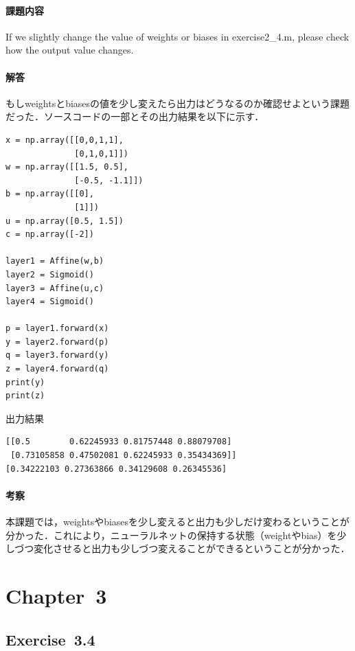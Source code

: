 \documentclass[11pt, a4paper]{jsarticle}
\begin{document}
  \paragraph{ 課題内容}
  If we slightly change the value of weights or biases in exercise2\_4.m, please check how the output value changes.

  \paragraph{ 解答}
  もしweightsとbiasesの値を少し変えたら出力はどうなるのか確認せよという課題だった．ソースコードの一部とその出力結果を以下に示す．

  \begin{lstlisting}[caption=Exercise~2.6, label=src:exercise2.6]
x = np.array([[0,0,1,1],
              [0,1,0,1]])
w = np.array([[1.5, 0.5],
              [-0.5, -1.1]])
b = np.array([[0],
              [1]])
u = np.array([0.5, 1.5])
c = np.array([-2])

layer1 = Affine(w,b)
layer2 = Sigmoid()
layer3 = Affine(u,c)
layer4 = Sigmoid()

p = layer1.forward(x)
y = layer2.forward(p)
q = layer3.forward(y)
z = layer4.forward(q)
print(y)
print(z)
  \end{lstlisting}

  \begin{itembox}[l]{出力結果}
    \begin{verbatim}
[[0.5        0.62245933 0.81757448 0.88079708]
 [0.73105858 0.47502081 0.62245933 0.35434369]]
[0.34222103 0.27363866 0.34129608 0.26345536]
    \end{verbatim}
  \end{itembox}

  \paragraph{ 考察}
  本課題では，weightsやbiasesを少し変えると出力も少しだけ変わるということが分かった．これにより，ニューラルネットの保持する状態（weightやbias）を少しづつ変化させると出力も少しづつ変えることができるということが分かった．

  \section{Chapter~3}
  \subsection{Exercise~3.4}
\end{document}

